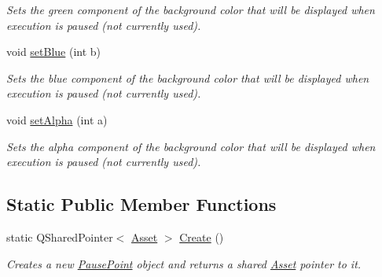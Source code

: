 \begin{DoxyCompactItemize}
\begin{DoxyCompactList}\small\item\em Sets the green component of the background color that will be displayed when execution is paused (not currently used). \end{DoxyCompactList}\item 
\hypertarget{class_picto_1_1_pause_point_ab8459be00f88414d7280cd1b473beb29}{void \hyperlink{class_picto_1_1_pause_point_ab8459be00f88414d7280cd1b473beb29}{set\-Blue} (int b)}\label{class_picto_1_1_pause_point_ab8459be00f88414d7280cd1b473beb29}

\begin{DoxyCompactList}\small\item\em Sets the blue component of the background color that will be displayed when execution is paused (not currently used). \end{DoxyCompactList}\item 
\hypertarget{class_picto_1_1_pause_point_a87a8cac35bb35094f17680a94fe6370a}{void \hyperlink{class_picto_1_1_pause_point_a87a8cac35bb35094f17680a94fe6370a}{set\-Alpha} (int a)}\label{class_picto_1_1_pause_point_a87a8cac35bb35094f17680a94fe6370a}

\begin{DoxyCompactList}\small\item\em Sets the alpha component of the background color that will be displayed when execution is paused (not currently used). \end{DoxyCompactList}\end{DoxyCompactItemize}
\subsection*{Static Public Member Functions}
\begin{DoxyCompactItemize}
\item 
\hypertarget{class_picto_1_1_pause_point_a3514af7a7157fdfb40e48b5fc47e3bb6}{static Q\-Shared\-Pointer$<$ \hyperlink{class_picto_1_1_asset}{Asset} $>$ \hyperlink{class_picto_1_1_pause_point_a3514af7a7157fdfb40e48b5fc47e3bb6}{Create} ()}\label{class_picto_1_1_pause_point_a3514af7a7157fdfb40e48b5fc47e3bb6}

\begin{DoxyCompactList}\small\item\em Creates a new \hyperlink{class_picto_1_1_pause_point}{Pause\-Point} object and returns a shared \hyperlink{class_picto_1_1_asset}{Asset} pointer to it. \end{DoxyCompactList}\end{DoxyCompactItemize}
